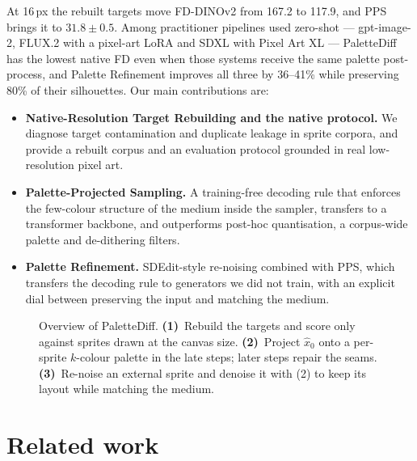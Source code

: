 \documentclass{article} %
\newcommand{\ours}{PaletteDiff}
\begin{document}
At 16\,px the rebuilt targets move FD-DINOv2 from 167.2 to 117.9, and PPS brings it to $31.8\pm0.5$. Among practitioner
pipelines used zero-shot --- gpt-image-2, FLUX.2 with a pixel-art LoRA and SDXL with Pixel Art XL --- \ours{} has the
lowest native FD even when those systems receive the same palette post-process, and Palette Refinement improves all
three by 36--41\% while preserving 80\% of their silhouettes. Our main contributions are:
\begin{itemize}[leftmargin=1.2em,itemsep=1pt,topsep=2pt]
  \item \textbf{Native-Resolution Target Rebuilding and the native protocol.} We diagnose target contamination and
  duplicate leakage in sprite corpora, and provide a rebuilt corpus and an evaluation protocol grounded in real
  low-resolution pixel art.
  \item \textbf{Palette-Projected Sampling.} A training-free decoding rule that enforces the few-colour structure of
  the medium inside the sampler, transfers to a transformer backbone, and outperforms post-hoc quantisation, a
  corpus-wide palette and de-dithering filters.
  \item \textbf{Palette Refinement.} SDEdit-style re-noising combined with PPS, which transfers the decoding rule to
  generators we did not train, with an explicit dial between preserving the input and matching the medium.
\end{itemize}

\begin{figure}[t]
\centering
\resizebox{0.98\linewidth}{!}{}
\caption{Overview of \ours{}. \textbf{(1)}~Rebuild the targets and score only against sprites drawn at the canvas size.
\textbf{(2)}~Project $\hat x_0$ onto a per-sprite $k$-colour palette in the late steps; later steps repair the seams.
\textbf{(3)}~Re-noise an external sprite and denoise it with (2) to keep its layout while matching the medium.}
\label{fig:overview}
\end{figure}
\FloatBarrier

\section{Related work}
\label{sec:related}
\end{document}
